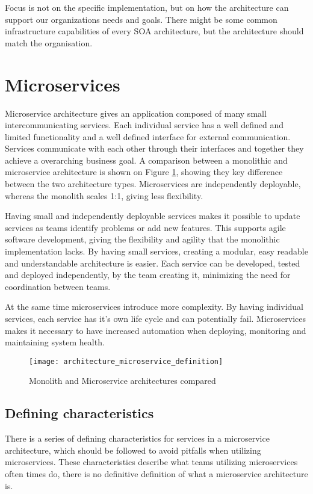 Focus is not on the specific implementation, but on how the architecture can support our organizations needs and goals. There might be some common infrastructure capabilities of every SOA architecture, but the architecture should match the organisation. 






\section{Microservices}
Microservice architecture gives an application composed of many small intercommunicating services. Each individual service has a well defined and limited functionality and a well defined interface for external communication. Services communicate with each other through their interfaces and together they achieve a overarching business goal\cite[p.~2]{newman2015microservices}. A comparison between a monolithic and microservice architecture is shown on Figure \ref{fig:architecture_microservice_definition}, showing they key difference between the two architecture types. Microservices are independently deployable, whereas the monolith scales 1:1, giving less flexibility. 

Having small and independently deployable services makes it possible to update services as teams identify problems or add new features. This supports agile software development, giving the flexibility and agility that the monolithic implementation lacks. By having small services, creating a modular, easy readable and understandable architecture is easier. Each service can be developed, tested and deployed independently, by the team creating it, minimizing the need for coordination between teams\cite{kniberg2014spotify}.

At the same time microservices introduce more complexity. By having individual services, each service has it's own life cycle and can potentially fail. Microservices makes it necessary to have increased automation when deploying, monitoring and maintaining system health\cite{meshenberg2016microservices}.


\begin{figure}[!htb]
  \texttt{[image: architecture\_microservice\_definition]}  
  \caption{Monolith and Microservice architectures compared}
  \label{fig:architecture_microservice_definition}
\end{figure}

\subsection{Defining characteristics}
There is a series of defining characteristics for services in a microservice architecture, which should be followed to avoid pitfalls when utilizing microservices. These characteristics describe what teams utilizing microservices often times do, there is no definitive definition of what a microservice architecture is.

